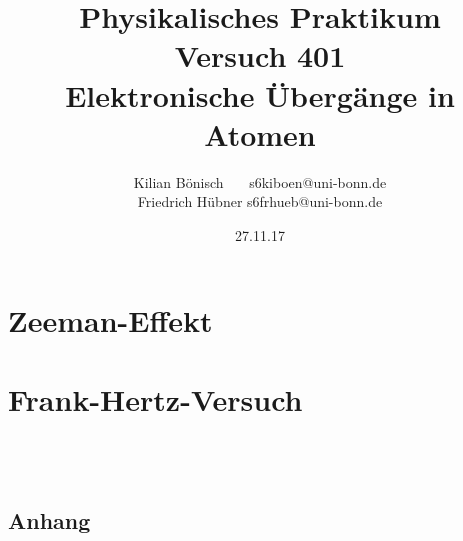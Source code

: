 \documentclass{report}
\newcommand{\RM}[1]{\MakeUppercase{\romannumeral #1}}
\begin{document}
\setlength{\parindent}{0em}   %
\title{Physikalisches Praktikum \RM{4}\\Versuch 401\\Elektronische Übergänge in Atomen}
\author{Kilian Bönisch \ \ \ \qquad s6kiboen@uni-bonn.de \\
  Friedrich Hübner \qquad s6frhueb@uni-bonn.de }
\date{27.11.17}

\maketitle

\newpage

\thispagestyle{empty}

\tableofcontents

\newpage



\chapter{Zeeman-Effekt}




\chapter{Frank-Hertz-Versuch}


\\ \\





\newpage
\section{Anhang}
%

\FloatBarrier
\printbibliography
\end{document}
